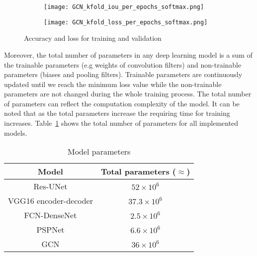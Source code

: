 \begin{figure} [!h]
	\hfill
	\begin{subfigure}[b]{0.47\textwidth}
		\centering
		\texttt{[image: GCN\_kfold\_iou\_per\_epochs\_softmax.png]}
		\caption{}
		\label{fig:gcn_accuracy_metric}
	\end{subfigure}
	\hfill
	\begin{subfigure}[b]{0.47\textwidth}
		\centering
		\texttt{[image: GCN\_kfold\_loss\_per\_epochs\_softmax.png]}
		\caption{}
		\label{fig:gcn_loss_metric}
	\end{subfigure}
	\caption{Accuracy and loss for training and validation}
	\label{fig:accuracy_metric}
\end{figure} 
Moreover, the total number of parameters in any deep learning model is a sum of the trainable parameters (e.g weights of convolution filters) and non-trainable parameters (biases and pooling filters).
Trainable parameters are continuously updated until we reach the minimum loss value while the non-trainable parameters are not changed during the whole training process.
The total number of parameters can reflect the computation complexity of the model.
It can be noted that as the total parameters increase the requiring time for training increases.
Table~\ref{tab:table_parameters} shows the total number of parameters for all implemented models.
\begin{table}[]
	\centering
	\caption{Model parameters}
	\label{tab:table_parameters}
		\begin{tabular}{cc}\hline
			Model &  Total parameters (\(\approx\)) \\ \hline
			Res-UNet & \(52\times 10^6\) \\ 
			VGG16 encoder-decoder & \(37.3\times 10^6\)  \\
			FCN-DenseNet & \(2.5\times 10^6\) \\ 
			PSPNet & \(6.6\times 10^6\) \\ 
			GCN & \(36\times 10^6\) \\ \hline
		\end{tabular}
\end{table}

